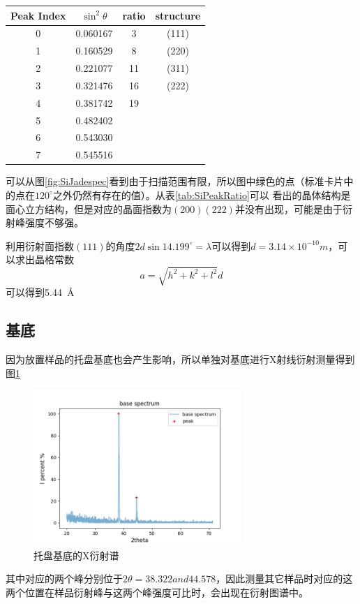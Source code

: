 \documentclass[10pt]{ctexart}
\begin{document}
\begin{minipage}{0.45\textwidth}
{\small
\begin{tabular}{|c|c|c|c|}
    \textbf{Peak Index} & \textbf{$\sin^2{\theta}$}& \textbf{ratio}& \textbf{structure}\\
    \hline
    0  &  0.060167&3&(111)\\
1   & 0.160529&8&(220)\\
2  &  0.221077&11&(311)\\
3  &  0.321476&16&(222)\\
4  &  0.381742&19&\\
5  &  0.482402&&\\
6  &  0.543030&&\\
7  &  0.545516&&\\
\end{tabular}
\centering
{}
\label{tab:SiPeakRatio}
}
\end{minipage}
\begin{minipage}{0.5\textwidth}
    可以从图\ref{fig:SiJadespec}看到由于扫描范围有限，所以图中绿色的点（标准卡片中的点在$120^\circ$之外仍然有存在的值）。从表\ref{tab:SiPeakRatio}可以
    看出的晶体结构是面心立方结构，但是对应的晶面指数为$(200)(222)$并没有出现，可能是由于衍射峰强度不够强。

    利用衍射面指数$(111)$的角度$2d\sin{14.199^\circ}=\lambda$可以得到$d=3.14\times 10^{-10}m$，可以求出晶格常数
    \[a=\sqrt{h^2+k^2+l^2}d\]
    可以得到\SI{5.44}{\angstrom}
\end{minipage}
\subsection{基底}
因为放置样品的托盘基底也会产生影响，所以单独对基底进行X射线衍射测量得到图\ref{fig:base}
\begin{figure}[htbp]
    \centering
    \includegraphics[width=0.7\textwidth]{data/base/spectrum.png}
    \caption{托盘基底的X衍射谱}
    \label{fig:base}
\end{figure}
其中对应的两个峰分别位于$2\theta=38.322 and 44.578$，因此测量其它样品时对应的这两个位置在样品衍射峰与这两个峰强度可比时，会出现在衍射图谱中。
\end{document}
